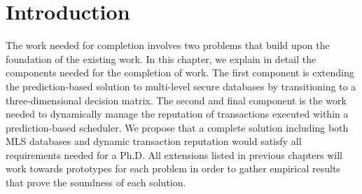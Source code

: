 \section{Introduction}
\label{do:introduction}

The work needed for completion involves two problems that build upon the foundation of the existing work. In this chapter, we explain in detail the components needed for the completion of work. The first component is extending the prediction-based solution to multi-level secure databases by transitioning to a three-dimensional decision matrix. The second and final component is the work needed to dynamically manage the reputation of transactions executed within a prediction-based scheduler. We propose that a complete solution including both MLS databases and dynamic transaction reputation would satisfy all requirements needed for a Ph.D. All extensions listed in previous chapters will work towards prototypes for each problem in order to gather empirical results that prove the soundness of each solution.
